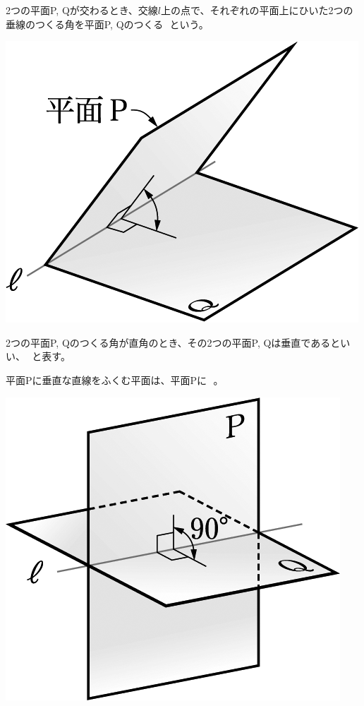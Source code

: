 \documentclass[
  12pt,a4paper,lualatex,ja=standard]{bxjsarticle}
\begin{document}
\begin{multicols}{2}
2つの平面P, Qが交わるとき、交線$l$上の点で、それぞれの平面上にひいた2つの垂線のつくる角を平面P, Qのつくる\,  \,という。

\columnbreak

\begin{center}
\includegraphics{media/image60.png}
\end{center}

\end{multicols}

\begin{multicols}{2}
2つの平面P, Qのつくる角が直角のとき、その2つの平面P, Qは垂直であるといい、\,  \,と表す。

平面Pに垂直な直線をふくむ平面は、平面Pに\,  \,。

\columnbreak

\begin{center}
\includegraphics{media/image63.png}
\end{center}
\end{multicols}
\end{document}

